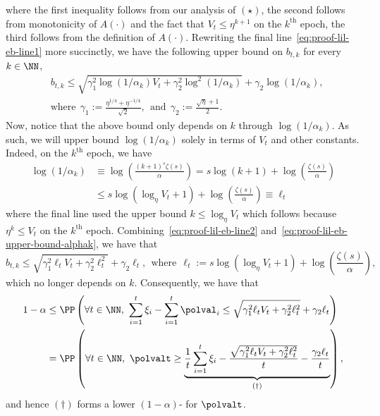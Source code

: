 where the first inequality follows from our analysis of $(\star)$, the second follows from monotonicity of $A(\cdot)$ and the fact that $V_t \leq \eta^{k+1}$ on the $k^\mathrm{th}$ epoch, the third follows from the definition of $A(\cdot)$. Rewriting the final line~\eqref{eq:proof-lil-eb-line1} more succinctly, we have the following upper bound on $b_{t,k}$ for every $k \in \NN$,
\begin{align}
  &b_{t,k} \leq \sqrt{\gamma_1^2 \log(1/\alpha_k) V_t + \gamma_2^2 \log^2(1/\alpha_k)} + \gamma_2 \log(1/\alpha_k), \label{eq:proof-lil-eb-line2}\\
  &\text{where}~~\gamma_1 := \frac{\eta^{1/4} + \eta^{-1/4}}{\sqrt{2}},~~\text{and}~~\gamma_2 := \frac{\sqrt{\eta} + 1}{2}.
\end{align}
Now, notice that the above bound only depends on $k$ through $\log(1/\alpha_k)$. As such, we will upper bound $\log(1/\alpha_k)$ solely in terms of $V_t$ and other constants. Indeed, on the $k^\mathrm{th}$ epoch, we have
\begin{align}
  \log(1/\alpha_k) &\equiv \log \left ( \frac{(k+1)^s \zeta(s)}{\alpha} \right ) \nonumber 
                   = s\log \left ( k+1 \right ) + \log \left ( \frac{\zeta(s)}{\alpha} \right ) \nonumber \\
  & \leq s \log \left ( \log_\eta V_t + 1 \right ) + \log \left ( \frac{\zeta(s)}{\alpha} \right ) \equiv \ell_t\label{eq:proof-lil-eb-upper-bound-alphak}
\end{align}
where the final line used the upper bound $k \leq \log_\eta V_t $ which follows because $\eta^k \leq V_t$ on the $k^\mathrm{th}$ epoch. Combining~\eqref{eq:proof-lil-eb-line2} and~\eqref{eq:proof-lil-eb-upper-bound-alphak}, we have that
\begin{equation}
  b_{t,k} \leq \sqrt{\gamma_1^2 \ell_t V_t + \gamma_2^2 \ell_t^2} + \gamma_2 \ell_t, ~~\text{where}~~\ell_t := s \log \left ( \log_\eta V_t + 1 \right ) + \log \left ( \frac{\zeta(s)}{\alpha} \right ),
\end{equation}
which no longer depends on $k$. Consequently, we have that
\begin{align*}
  1-\alpha &\leq \PP \left ( \forall t \in \NN,\ \sum_{i=1}^t \xi_i - \sum_{i=1}^t \polval_i \leq \sqrt{\gamma_1^2 \ell_t V_t + \gamma_2^2 \ell_t^2} + \gamma_2 \ell_t \right ) \\
  & = \PP \left ( \forall t \in \NN,\ \polvalt \geq \underbrace{\frac{1}{t} \sum_{i=1}^t \xi_i - \frac{\sqrt{\gamma_1^2 \ell_t V_t + \gamma_2^2 \ell_t^2}}{t} - \frac{\gamma_2 \ell_t}{t}}_{(\dagger)} \right ),
\end{align*}
and hence $(\dagger)$ forms a lower $(1-\alpha)$-\cs{} for $\polvalt$.


